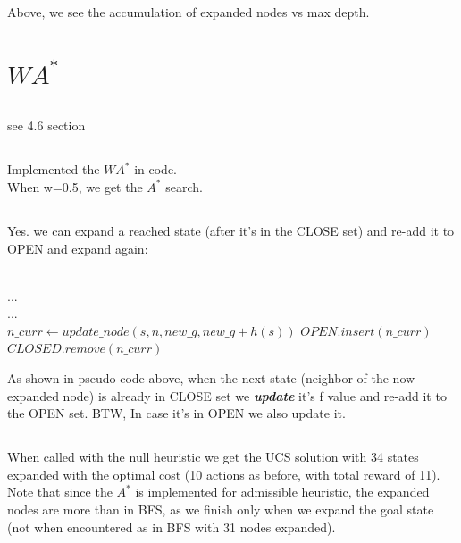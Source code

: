 \documentclass[12pt]{article}
\begin{document}
Above, we see the accumulation of expanded nodes vs max depth.

\section{$WA^*$}
\subsection{}

see 4.6 section

\subsection{}

Implemented the $WA^*$ in code.\\
When w=0.5, we get the $A^*$ search.

\subsection{}

Yes. we can expand a reached state (after it's in the CLOSE set) and re-add it to OPEN and expand again:\\
\begin{algorithmic}
\\
    ...
\\
    ...
\Else {}\\
        \State $n\_curr \gets update\_node(s, n, new\_g ,new\_g + h(s))$
        \State $OPEN.insert(n\_curr)$
        \State $CLOSED.remove(n\_curr)$
    \EndIf
\EndIf 
\end{algorithmic}
As shown in pseudo code above, when the next state (neighbor of the now expanded node) is already in CLOSE set we {\textit{\textbf{update}}} it's f value and re-add it to the OPEN set.
BTW, In case it's in OPEN we also update it.

\subsection{}

When called with the null heuristic we get the UCS solution with 34 states expanded with the optimal cost (10 actions as before, with total reward of 11). Note that since the $A^*$ is implemented for admissible heuristic, the expanded nodes are more than in BFS, as we finish only when we expand the goal state (not when encountered as in BFS with 31 nodes expanded).
\end{document}
